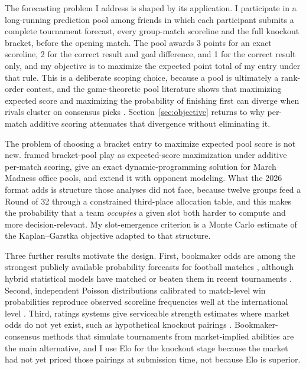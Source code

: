 \documentclass[11pt,letterpaper]{article}
\begin{document}
The forecasting problem I address is shaped by its application. I participate in a long-running prediction pool among friends in which each participant submits a complete tournament forecast, every group-match scoreline and the full knockout bracket, before the opening match. The pool awards 3 points for an exact scoreline, 2 for the correct result and goal difference, and 1 for the correct result only, and my objective is to maximize the expected point total of my entry under that rule. This is a deliberate scoping choice, because a pool is ultimately a rank-order contest, and the game-theoretic pool literature shows that maximizing expected score and maximizing the probability of finishing first can diverge when rivals cluster on consensus picks \citep{clairletscher2007}. Section~\ref{sec:objective} returns to why per-match additive scoring attenuates that divergence without eliminating it.

The problem of choosing a bracket entry to maximize expected pool score is not new. \citet{breiter1997} framed bracket-pool play as expected-score maximization under additive per-match scoring, \citet{kaplangarstka2001} give an exact dynamic-programming solution for March Madness office pools, and \citet{clairletscher2007} extend it with opponent modeling. What the 2026 format adds is structure those analyses did not face, because twelve groups feed a Round of 32 through a constrained third-place allocation table, and this makes the probability that a team \emph{occupies} a given slot both harder to compute and more decision-relevant. My slot-emergence criterion is a Monte Carlo estimate of the Kaplan--Garstka objective adapted to that structure.

Three further results motivate the design. First, bookmaker odds are among the strongest publicly available probability forecasts for football matches \citep{strumbelj2014, leitner2010}, although hybrid statistical models have matched or beaten them in recent tournaments \citep{groll2018, groll2019}. Second, independent Poisson distributions calibrated to match-level win probabilities reproduce observed scoreline frequencies well at the international level \citep{maher1982, dixoncoles1997}. Third, ratings systems give serviceable strength estimates where market odds do not yet exist, such as hypothetical knockout pairings \citep{hvattum2010, elo1978, constantinou2019}. Bookmaker-consensus methods that simulate tournaments from market-implied abilities \citep{zeileis2018} are the main alternative, and I use Elo for the knockout stage because the market had not yet priced those pairings at submission time, not because Elo is superior.
\end{document}

